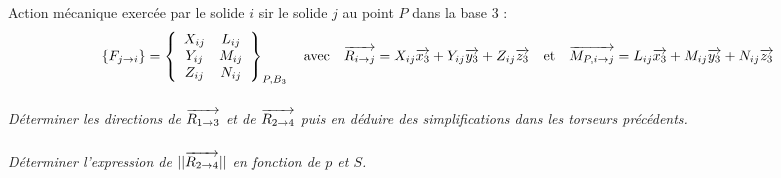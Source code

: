 \documentclass[10pt]{article}
\begin{document}
Action mécanique exercée par le solide $i$ sir le solide $j$ au point $P$ dans la base 3 :
$$
\left\{
F_{j \rightarrow i} 
\right\}=
\left\{
\begin{array}{cc}
X_{ij} & L_{ij} \\
Y_{ij} & M_{ij} \\
Z_{ij} & N_{ij} \\
\end{array}
\right\}_{P,B_3}
\quad \text{avec} \quad
\overrightarrow{R_{i\rightarrow j}} = X_{ij}\overrightarrow{x_3}+Y_{ij}\overrightarrow{y_3}+Z_{ij}\overrightarrow{z_3} 
\quad \text{et} \quad
\overrightarrow{M_{P, i\rightarrow j}} = L_{ij}\overrightarrow{x_3}+M_{ij}\overrightarrow{y_3}+N_{ij}\overrightarrow{z_3} 
$$

\subparagraph{}
\textit{Déterminer les directions de $\overrightarrow{R_{1\rightarrow 3}}$ et de $\overrightarrow{R_{2\rightarrow 4}}$ puis en déduire des simplifications dans les torseurs précédents.}

\subparagraph{}
\textit{Déterminer l'expression de $||\overrightarrow{R_{2\rightarrow 4}}||$ en fonction de $p$ et $S$.}
\end{document}
